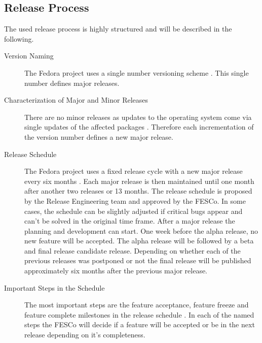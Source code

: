 \subsection{Release Process}

The used release process is highly structured and will be described in the
following.

\begin{description}

  \item[Version Naming] The Fedora project uses a single number versioning
    scheme \cite{FedoraHistoricalSchedules,FedoraLifeCycle}. This single
    number defines major releases.

  \item[Characterization of Major and Minor Releases] There are no minor
    releases as updates to the operating system come via single updates of
    the affected packages \cite{FedoraHistoricalSchedules,FedoraLifeCycle}.
    Therefore each incrementation of the version number defines a new major
    release.

  \item[Release Schedule] The Fedora project uses a fixed release cycle with
    a new major release every six months
    \cite{FedoraLifeCycle,FedoraReleaseEngineering}. Each major release is
    then maintained until one month after another two releases or 13 months.
    The release schedule is proposed by the Release Engineering team and
    approved by the \ac{FESCo}. In some cases, the schedule can be slightly
    adjusted if critical bugs appear and can't be solved in the original time
    frame. After a major release the planning and development can start. One
    week before the alpha release, no new feature will be accepted. The alpha
    release will be followed by a beta and final release candidate release.
    Depending on whether each of the previous releases was postponed or not
    the final release will be published approximately six months after the
    previous major release.

  \item[Important Steps in the Schedule] The most important steps are the
    feature acceptance, feature freeze and feature complete milestones in the
    release schedule \cite{FedoraLifeCycle}. In each of the named steps the
    \ac{FESCo} will decide if a feature will be accepted or be in the next
    release depending on it's completeness.

\end{description}

